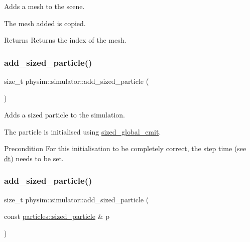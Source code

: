 Adds a mesh to the scene. 

The mesh added is copied. \begin{DoxyReturn}{Returns}
Returns the index of the mesh. 
\end{DoxyReturn}
\mbox{\label{classphysim_1_1simulator_ae36d99f98f5e470934eea0523ffca583}} 
\subsubsection{\texorpdfstring{add\+\_\+sized\+\_\+particle()}{add\_sized\_particle()}\hspace{0.1cm}{\footnotesize\ttfamily [1/2]}}
{\footnotesize\ttfamily size\+\_\+t physim\+::simulator\+::add\+\_\+sized\+\_\+particle (\begin{DoxyParamCaption}{ }\end{DoxyParamCaption})}



Adds a sized particle to the simulation. 

The particle is initialised using \hyperlink{classphysim_1_1simulator_a61d4f20480309e95fce1db56b7fc8a88}{sized\+\_\+global\+\_\+emit}. \begin{DoxyPrecond}{Precondition}
For this initialisation to be completely correct, the step time (see \hyperlink{classphysim_1_1simulator_a12a60d0ed819937b51ce50162dbdd6e1}{dt}) needs to be set. 
\end{DoxyPrecond}
\mbox{\label{classphysim_1_1simulator_aa7b066130ec71e7f8985ebc94605cf3b}} 
\subsubsection{\texorpdfstring{add\+\_\+sized\+\_\+particle()}{add\_sized\_particle()}\hspace{0.1cm}{\footnotesize\ttfamily [2/2]}}
{\footnotesize\ttfamily size\+\_\+t physim\+::simulator\+::add\+\_\+sized\+\_\+particle (\begin{DoxyParamCaption}\item[{const \hyperlink{classphysim_1_1particles_1_1sized__particle}{particles\+::sized\+\_\+particle} \&}]{p }\end{DoxyParamCaption})}



